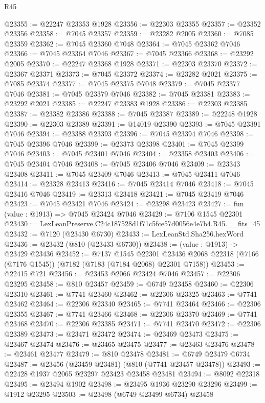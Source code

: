 \begin{lexlean}{R45}
\begin{coremodule}
{@23355 := @22247 @23353 @1928
@23356 := @22303 @23355
@23357 := @23352 @23356
@23358 := @7045 @23357
@23359 := @23282 @2005
@23360 := @7085 @23359
@23362 := @7045 @23360 @7048
@23364 := @7045 @23362 @7046
@23366 := @7045 @23364 @7046
@23367 := @7045 @23366
@23368 := @23292 @2005
@23370 := @22247 @23368 @1928
@23371 := @22303 @23370
@23372 := @23367 @23371
@23373 := @7045 @23372
@23374 := @23282 @2021
@23375 := @7085 @23374
@23377 := @7045 @23375 @7048
@23379 := @7045 @23377 @7046
@23381 := @7045 @23379 @7046
@23382 := @7045 @23381
@23383 := @23292 @2021
@23385 := @22247 @23383 @1928
@23386 := @22303 @23385
@23387 := @23382 @23386
@23388 := @7045 @23387
@23389 := @22248 @1928
@23390 := @22303 @23389
@23391 := @14019 @23390
@23393 := @7045 @23391 @7046
@23394 := @23388 @23393
@23396 := @7045 @23394 @7046
@23398 := @7045 @23396 @7046
@23399 := @23373 @23398
@23401 := @7045 @23399 @7046
@23403 := @7045 @23401 @7046
@23404 := @23358 @23403
@23406 := @7045 @23404 @7046
@23408 := @7045 @23406 @7046
@23409 := @23343 @23408
@23411 := @7045 @23409 @7046
@23413 := @7045 @23411 @7046
@23414 := @23328 @23413
@23416 := @7045 @23414 @7046
@23418 := @7045 @23416 @7046
@23419 := @23313 @23418
@23421 := @7045 @23419 @7046
@23423 := @7045 @23421 @7046
@23424 := @23298 @23423
@23427 := fun (value : @1913) => @7045 @23424 @7046
@23429 := @7106 @1545 @22301
@23430 := LexLeanPreserve.C24c187528d1f71c5fce57d0056e4e7b4.R45.__fits_45
@23432 := @7120 (@23430 @6730)
@23433 := LexLeanStd.Sha256.hexWord
@23436 := @23432 (@810 (@23433 @6730))
@23438 := (value : @1913) -> @23429 @23436
@23452 := @7137
    @1545
    @22301
    @23436
    @2068
    @22318
    (@7166 (@7176 @1545))
    (@7182 (@7183 (@7184 @2068) @22301 @7158))
@23453 := @22415 @721
@23456 := @23453 @2066 @23424 @7046
@23457 := @22306 @23295
@23458 := @810 @23457
@23459 := @6749 @23458
@23460 := @22306 @23310
@23461 := @7741 @23460
@23462 := @22306 @23325
@23463 := @7741 @23462
@23464 := @22306 @23340
@23465 := @7741 @23464
@23466 := @22306 @23355
@23467 := @7741 @23466
@23468 := @22306 @23370
@23469 := @7741 @23468
@23470 := @22306 @23385
@23471 := @7741 @23470
@23472 := @22306 @23389
@23473 := @23471 @23472
@23474 := @23469 @23473
@23475 := @23467 @23474
@23476 := @23465 @23475
@23477 := @23463 @23476
@23478 := @23461 @23477
@23479 := @810 @23478
@23481 := @6749 @23479 @6734
@23487 := @23456 (@23459 @23481) (@810 (@7741 @23457 @23478))
@23493 := @22428 @1937 @2065 @23297 @23423 @23458 @23481
@23494 := @8092 @22318
@23495 := @23494 @1902
@23498 := @23495 @1936 @23290 @23296
@23499 := @1912 @23295
@23503 := @23498 (@6749 @23499 @6734) @23458
}
\end{coremodule}
\end{lexlean}
